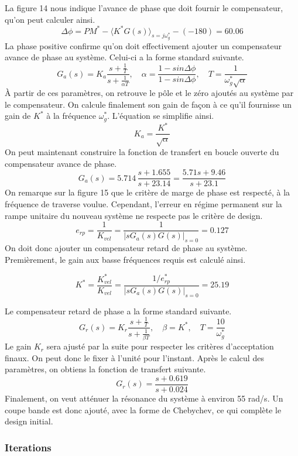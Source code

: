 \documentclass{udes_rapport} %
\begin{document}
La figure 14 nous indique l'avance de phase que doit fournir le compensateur, qu'on peut calculer ainsi.
\[ \Delta \phi = PM^* - \langle K^*G(s)\rangle_{s=j\omega_g^*} -(-180)=60.06\] 
La phase positive confirme qu'on doit effectivement ajouter un compensateur avance de phase au système. Celui-ci a la forme standard suivante.
 \[ G_a(s)=K_a\frac{s+\frac{1}{T}}{s+\frac{1}{\alpha T}}, \quad \alpha = \frac{1-sin\Delta\phi}{1-sin\Delta\phi}, \quad T = \frac{1}{\omega_g^*\sqrt{\alpha}}\]
 À partir de ces paramètres, on retrouve le pôle et le zéro ajoutés au système par le compensateur. On calcule finalement son gain de façon à ce qu'il fournisse un gain de $K^*$ à la fréquence $\omega_g^*$. L'équation se simplifie ainsi.
 \[K_a = \frac{K^*}{\sqrt{\alpha}}\]
On peut maintenant construire la fonction de transfert en boucle ouverte du compensateur avance de phase.
\[ G_a(s) = 5.714\,\frac{s+1.655}{s+23.14} = \frac{5.71s+9.46}{s+23.1} \]
On remarque sur la figure 15 que le critère de marge de phase est respecté, à la fréquence de traverse voulue.
Cependant, l'erreur en régime permanent sur la rampe unitaire du nouveau système ne respecte pas le critère de design.
\[ e_{rp} = \frac{1}{K_{vel}} = \frac{1}{|sG_a(s)G(s)|_{s=0}}=0.127 \]
On doit donc ajouter un compensateur retard de phase au système. Premièrement, le gain aux basse fréquences requis est calculé ainsi.

\[ K^* = \frac{K_{vel}^*}{K_{vel}} = \frac{1/e_{rp}^*}{|sG_a(s)G(s)|_{s=0}} =  25.19\]

Le compensateur retard de phase a la forme standard suivante.
 \[ G_r(s)=K_r\frac{s+\frac{1}{T}}{s+\frac{1}{\beta T}}, \quad \beta = K^*, \quad T = \frac{10}{\omega_g^*}\]
 Le gain $K_r$ sera ajusté par la suite pour respecter les critères d'acceptation finaux. On peut donc le fixer à l'unité pour l'instant. Après le calcul des paramètres, on obtiens la fonction de transfert suivante.
\[ G_r(s) = \frac{s+0.619}{s+0.024} \]
Finalement, on veut atténuer la résonance du système à environ 55 rad/s. Un coupe bande est donc ajouté, avec la forme de Chebychev, ce qui complète le design initial.

\subsubsection{Iterations}
\end{document}
